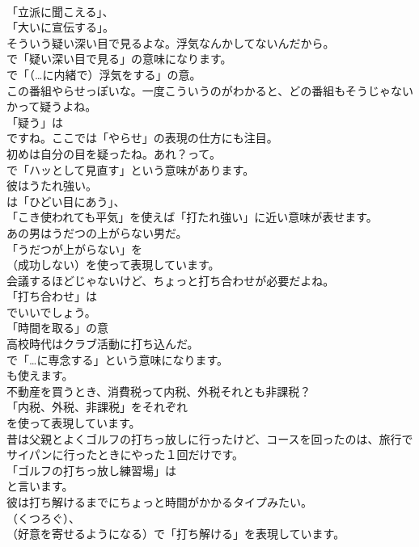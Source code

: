 \documentclass[8pt]{extreport}
\begin{document}
\begin{CJK}{UTF8}{min}
\\	「立派に聞こえる」、
\\	「大いに宣伝する」。	
\\	そういう疑い深い目で見るよな。浮気なんかしてないんだから。 
\\	で「疑い深い目で見る」の意味になります。
\\	で「（…に内緒で）浮気をする」の意。	
\\	この番組やらせっぽいな。一度こういうのがわかると、どの番組もそうじゃないかって疑うよね。 
\\	「疑う」は
\\	ですね。ここでは「やらせ」の表現の仕方にも注目。	
\\	初めは自分の目を疑ったね。あれ？って。 
\\	で「ハッとして見直す」という意味があります。	
\\	彼はうたれ強い。 
\\	は「ひどい目にあう」、
\\	「こき使われても平気」を使えば「打たれ強い」に近い意味が表せます。	
\\	あの男はうだつの上がらない男だ。 
\\	「うだつが上がらない」を 
\\	（成功しない）を使って表現しています。	
\\	会議するほどじゃないけど、ちょっと打ち合わせが必要だよね。 
\\	「打ち合わせ」は
\\	でいいでしょう。
\\	「時間を取る」の意	
\\	高校時代はクラブ活動に打ち込んだ。 
\\	で「…に専念する」という意味になります。
\\	も使えます。	
\\	不動産を買うとき、消費税って内税、外税それとも非課税？ 
\\	「内税、外税、非課税」をそれぞれ 
\\	を使って表現しています。	
\\	昔は父親とよくゴルフの打ちっ放しに行ったけど、コースを回ったのは、旅行でサイパンに行ったときにやった１回だけです。 
\\	「ゴルフの打ちっ放し練習場」は
\\	と言います。	
\\	彼は打ち解けるまでにちょっと時間がかかるタイプみたい。 
\\	（くつろぐ）、
\\	（好意を寄せるようになる）で「打ち解ける」を表現しています。	

\end{CJK}
\end{document}
